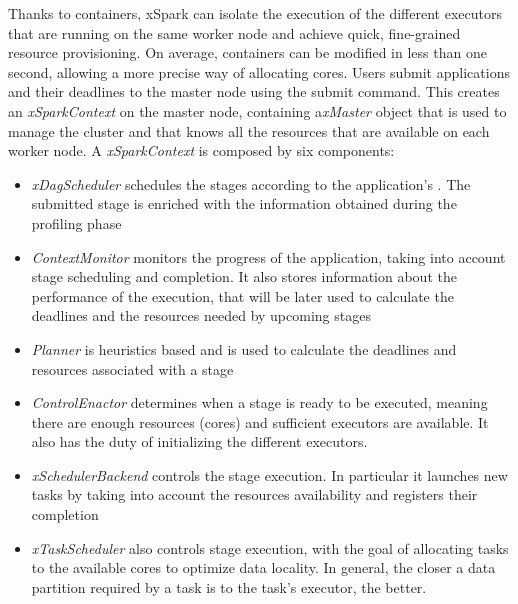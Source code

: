 Thanks to containers, xSpark can isolate the execution of the different executors that are running on the same worker node and achieve quick, fine-grained resource provisioning. On average, containers can be modified in less than one second, allowing a more precise way of
allocating cores.
Users submit applications and their deadlines to the master node using the submit command. This creates an \textit{xSparkContext} on the master node, containing a\textit{xMaster} object that is used to manage the cluster and that knows all the resources that are available on each worker
node. A \textit{xSparkContext} is composed by six components:
\begin{itemize}
	\item\textit{xDagScheduler} schedules the stages according to the application’s \plan. The submitted stage is enriched with the information obtained during the profiling phase
	\item\textit{ContextMonitor} monitors the progress of the application, taking into account stage scheduling and completion. It also stores information about the performance of the execution, that will be later used to calculate the deadlines and the resources needed by upcoming stages
	\item\textit{Planner} is heuristics based and is used to calculate the deadlines and resources associated with a stage
	\item\textit{ControlEnactor} determines when a stage is ready to be executed, meaning there are enough resources (cores) and sufficient executors are available. It also has the duty of initializing the different executors.
	\item\textit{xSchedulerBackend} controls the stage execution. In particular it launches new tasks by taking into account the resources availability and registers their completion
	\item\textit{xTaskScheduler} also controls stage execution, with the goal of allocating tasks to the available cores to optimize data locality. 
	In general, the closer a data partition required by a task is to the task’s executor, the better.
\end{itemize}

